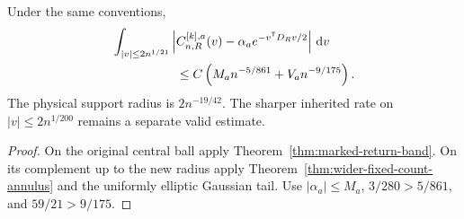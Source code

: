\begin{corollary}
\label{cor:wider-marked-central-band}
Under the same conventions,
\begin{align}
 &\int_{|v|\le2n^{1/21}}
 \left|C^{[k],a}_{n,R}(v)-\alpha_a e^{-v^{\mathsf T}D_Rv/2}\right|\dd v
 \notag\\
 &\hspace{18mm}\le C\left(M_an^{-5/861}+V_an^{-9/175}\right).
 \label{eq:wider-marked-central-band}
\end{align}
The physical support radius is $2n^{-19/42}$. The sharper inherited
rate on $|v|\le2n^{1/200}$ remains a separate valid estimate.
\end{corollary}
\begin{proof}
On the original central ball apply
Theorem~\ref{thm:marked-return-band}. On its complement up to the
new radius apply Theorem~\ref{thm:wider-fixed-count-annulus} and the
uniformly elliptic Gaussian tail. Use $|\alpha_a|\le M_a$,
$3/280>5/861$, and $59/21>9/175$.
\end{proof}

